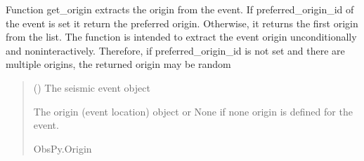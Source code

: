 \documentclass[letterpaper,10pt,english]{sphinxmanual}
\begin{document}
\begin{fulllineitems}
\label{\detokenize{api_core:amw.core.utils.get_origin}}
\pysigstartsignatures
{}
\pysigstopsignatures
\sphinxAtStartPar
Function get\_origin extracts the origin from the event.
If preferred\_origin\_id of the event is set it return the preferred origin.
Otherwise, it returns the first origin from the list.
The function is intended to extract the event origin unconditionally and non\sphinxhyphen{}interactively.
Therefore, if preferred\_origin\_id is not set and there are multiple origins, the returned origin may be random
\begin{quote}\begin{description}
\sphinxAtStartPar
{} () \textendash{} The seismic event object

\sphinxAtStartPar
The origin (event location) object or None if none origin is defined for the event.

\sphinxAtStartPar
ObsPy.Origin

\end{description}\end{quote}

\end{fulllineitems}

\end{document}
